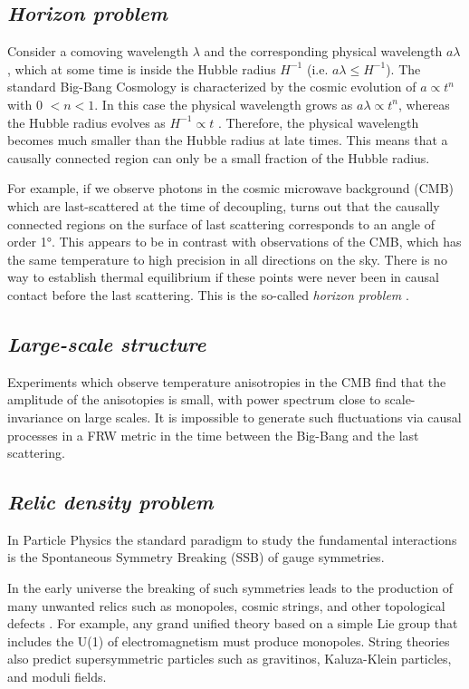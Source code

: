 \documentclass[11pt,a4paper,twoside]{book}
\begin{document}
\subsection*{\emph{Horizon problem}}
Consider a comoving wavelength $ \lambda $ and the corresponding physical wavelength $ a\lambda $, which at some time is inside the Hubble radius $ H^{-1} $ (i.e. $ a\lambda \leq  H^{-1}  $). The standard Big-Bang Cosmology is characterized by the cosmic evolution of  $a \propto t^{n} $ with 0 $< n < 1$. In this case the physical wavelength grows as $ a\lambda \propto t^{n} $, whereas the Hubble radius evolves as $H^{-1}\propto t$ . Therefore, the physical wavelength becomes much smaller than the Hubble radius at late times.
This means that a causally connected region can only be a small fraction of the Hubble radius.

For example, if we observe photons in the cosmic microwave background (CMB) which are last-scattered at the time of decoupling, turns out that the causally connected regions on the surface of last scattering corresponds to an angle of order 1°. This appears to be in contrast with observations of the CMB, which has the same temperature to high precision in all directions on the sky. There is no way to establish thermal equilibrium if these points were never been in causal contact before the last scattering. This is the so-called \textit{horizon problem} .

\subsection*{\emph{Large-scale structure}}
Experiments which observe temperature anisotropies in the CMB find that the amplitude of the anisotopies is small, with  power spectrum  close to scale-invariance on large scales. It is impossible to generate such fluctuations  via causal processes in a FRW metric in the time between the Big-Bang and  the last scattering.

\subsection*{\emph{Relic density problem}}
In Particle Physics the standard paradigm to study the fundamental interactions is the Spontaneous Symmetry Breaking (SSB) of gauge symmetries.

In the early universe the breaking of such symmetries leads to the production of many unwanted relics such as monopoles, cosmic strings, and other topological defects \cite{TopDefects:Linde}. For example, any grand unified theory based on a simple Lie group that includes the U(1) of electromagnetism must produce monopoles. String theories also predict supersymmetric particles such as gravitinos, Kaluza-Klein particles, and moduli fields.
\end{document}
